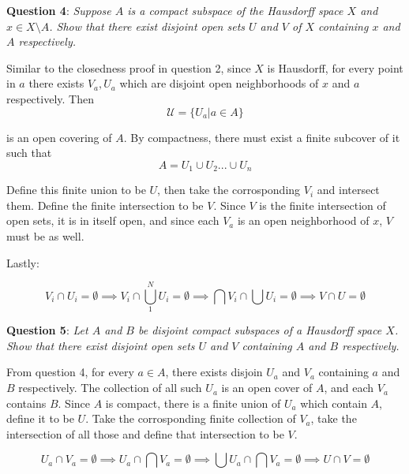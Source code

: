 \documentclass{article} %
\newcommand{\question}[2][]{
  \begin{flushleft}
    \textbf{Question #1}: \textit{#2}

\end{flushleft}}
\begin{document}
\question[4]{Suppose $A$ is a compact subspace of the Hausdorff space $X$
  and $x \in X \setminus A$.
  Show that there exist disjoint open sets $U$ and $V$ of $X$ containing $x$
and $A$ respectively.}

Similar to the closedness proof in question 2, since $X$ is
Hausdorff, for every point in $a$ there exists $V_a, U_a$ which are
disjoint open neighborhoods of $x$ and $a$ respectively. Then
\[
  \mathcal{U} = \{U_a | a \in A \}
\]

is an open covering of $A$. By compactness, there must exist a finite
subcover of it such that
\[
  A = U_1 \cup U_2 ... \cup U_n
\]

Define this finite union to be $U$, then take the corrosponding $V_i$
and intersect them. Define the finite intersection to be $V$. Since
$V$ is the finite intersection of open sets, it is in itself open,
and since each $V_a$ is an open neighborhood of $x$, $V$ must be as well.

Lastly:

$$V_i \cap U_i = \emptyset \implies V_i \cap \bigcup_1^N U_i = \emptyset
\implies \bigcap V_i \cap \bigcup U_i = \emptyset \implies V \cap U =
\emptyset$$

\question[5]{Let $A$ and $B$ be disjoint compact subspaces of a
  Hausdorff space $X$. Show
  that there exist disjoint open sets $U$ and $V$ containing $A$ and $B$
respectively.}

From question 4, for every $a \in A$, there exists disjoin $U_a$ and
$V_a$ containing $a$ and $B$ respectively. The collection of all such
$U_a$ is an open cover of $A$, and each $V_a$ contains $B$. Since $A$
is compact, there is a finite union of $U_a$ which contain $A$,
define it to be $U$. Take
the corrosponding finite collection of $V_a$, take the intersection
of all those and define that intersection to be $V$.

\[
  U_a \cap V_a = \emptyset \implies U_a \cap \bigcap V_a = \emptyset
  \implies \bigcup U_a \cap \bigcap V_a = \emptyset \implies U \cap V
  = \emptyset
\]
\end{document}
